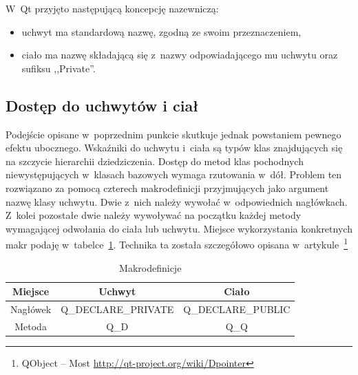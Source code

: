 W~Qt przyjęto następującą koncepcję nazewniczą:
\begin{itemize}
\item{uchwyt ma standardową nazwę, zgodną ze swoim przeznaczeniem,}
\item{ciało ma nazwę składającą się z~nazwy odpowiadającego mu uchwytu oraz sufiksu ,,Private''.}
\end{itemize}


\subsection{Dostęp do uchwytów i ciał}
Podejście opisane w~poprzednim punkcie skutkuje jednak powstaniem pewnego efektu ubocznego.
Wskaźniki do uchwytu i~ciała są typów klas znajdujących się na szczycie hierarchii dziedziczenia. Dostęp do metod klas pochodnych niewystępujących w~klasach bazowych wymaga rzutowania w~dół. 
Problem ten rozwiązano za pomocą czterech makrodefinicji przyjmujących jako argument nazwę klasy uchwytu. Dwie z~nich należy wywołać w~odpowiednich nagłówkach. Z~kolei pozostałe dwie należy wywoływać na początku każdej metody wymagającej odwołania do ciała lub uchwytu. Miejsce wykorzystania konkretnych makr podaję w~tabelce~\ref{tab:makra}. Technika ta została szczegółowo opisana w~artykule~\footnote{QObject -- Most \url{http://qt-project.org/wiki/Dpointer}}

\begin{table}[h]\footnotesize
\centering
\caption{Makrodefinicje}
\label{tab:makra}
\begin{tabular}{|c|c|c|}
\hline
Miejsce & Uchwyt & Ciało\\
\hline
Nagłówek & Q\_DECLARE\_PRIVATE & Q\_DECLARE\_PUBLIC\\
\hline
Metoda & Q\_D & Q\_Q\\
\hline
\end{tabular}
\end{table}
